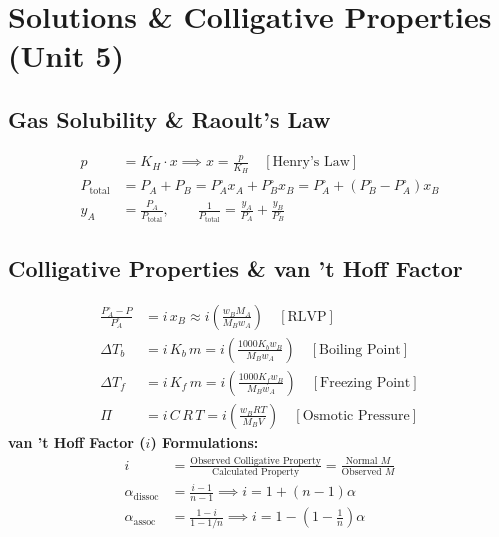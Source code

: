 \documentclass[10pt,twoside,openright]{book}
\begin{document}
\section{Solutions \& Colligative Properties (Unit 5)}

\subsection{Gas Solubility \& Raoult's Law}

\begin{formulabox}
\begin{align}
  p &= K_H \cdot x \implies x = \frac{p}{K_H} \quad [\text{Henry's Law}] \\
  P_{\text{total}} &= P_A + P_B = P_A^\circ x_A + P_B^\circ x_B = P_A^\circ + (P_B^\circ - P_A^\circ)x_B \\
  y_A &= \frac{P_A}{P_{\text{total}}}, \qquad \frac{1}{P_{\text{total}}} = \frac{y_A}{P_A^\circ} + \frac{y_B}{P_B^\circ}
\end{align}
\end{formulabox}

\subsection{Colligative Properties \& van 't Hoff Factor}

\begin{formulabox}
\begin{align}
  \frac{P_A^\circ - P}{P_A^\circ} &= i\,x_B \approx i\left(\frac{w_B M_A}{M_B w_A}\right) \quad [\text{RLVP}] \\
  \Delta T_b &= i\,K_b\,m = i\left(\frac{1000 K_b w_B}{M_B w_A}\right) \quad [\text{Boiling Point}] \\
  \Delta T_f &= i\,K_f\,m = i\left(\frac{1000 K_f w_B}{M_B w_A}\right) \quad [\text{Freezing Point}] \\
  \Pi &= i\,C\,R\,T = i\left(\frac{w_B R T}{M_B V}\right) \quad [\text{Osmotic Pressure}]
\end{align}
\textbf{van 't Hoff Factor ($i$) Formulations:}
\begin{align}
  i &= \frac{\text{Observed Colligative Property}}{\text{Calculated Property}} = \frac{\text{Normal } M}{\text{Observed } M} \\
  \alpha_{\text{dissoc}} &= \frac{i - 1}{n - 1} \implies i = 1 + (n - 1)\alpha \\
  \alpha_{\text{assoc}} &= \frac{1 - i}{1 - 1/n} \implies i = 1 - \left(1 - \frac{1}{n}\right)\alpha
\end{align}
\end{formulabox}
\end{document}
